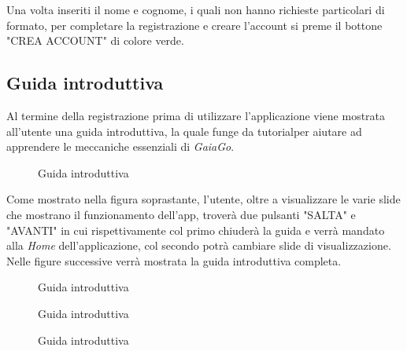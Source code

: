 Una volta inseriti il nome e cognome, i quali non hanno richieste particolari di formato, per completare la registrazione e creare l'account si preme il bottone "CREA ACCOUNT" di colore verde.

\subsection{Guida introduttiva}
Al termine della registrazione prima di utilizzare l'applicazione viene mostrata all'utente una guida introduttiva, la quale funge da tutorial\glosp per aiutare ad apprendere le meccaniche essenziali di \textit{GaiaGo}.
\begin{figure}[H] 
	\centering 
	\caption{Guida introduttiva}
	\label{guidaintroduttiva}
\end{figure}
Come mostrato nella figura soprastante, l'utente, oltre a visualizzare le varie slide che mostrano il funzionamento dell'app, troverà due pulsanti "SALTA" e "AVANTI" in cui rispettivamente col primo chiuderà la guida e verrà mandato alla \textit{Home} dell'applicazione, col secondo potrà cambiare slide di visualizzazione. Nelle figure successive verrà mostrata la guida introduttiva completa.
\begin{figure}[H] 
	\centering 
	\caption{Guida introduttiva}
	\label{guidaintroduttiva2}
\end{figure}
\begin{figure}[H] 
	\centering 
	\caption{Guida introduttiva}
	\label{guidaintroduttiva3}
\end{figure}
\begin{figure}[H] 
	\centering 
	\caption{Guida introduttiva}
	\label{guidaintroduttiva4}
\end{figure}
